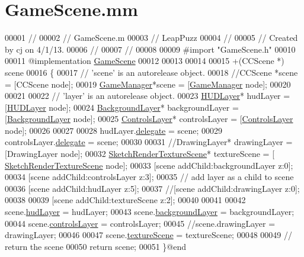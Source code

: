\hypertarget{_game_scene_8mm}{\section{Game\-Scene.\-mm}
\label{d1/d6a/_game_scene_8mm}
}

\begin{DoxyCode}
00001 \textcolor{comment}{//}
00002 \textcolor{comment}{//  GameScene.m}
00003 \textcolor{comment}{//  LeapPuzz}
00004 \textcolor{comment}{//}
00005 \textcolor{comment}{//  Created by cj on 4/1/13.}
00006 \textcolor{comment}{//}
00007 \textcolor{comment}{//}
00008 
00009 \textcolor{preprocessor}{#import "GameScene.h"}
00010 
00011 \textcolor{keyword}{@implementation }\hyperlink{interface_game_scene}{GameScene}
00012 
00013 
00014 
00015 +(CCScene *) scene
00016 \{
00017     \textcolor{comment}{// 'scene' is an autorelease object.}
00018     \textcolor{comment}{//CCScene *scene = [CCScene node];}
00019     \hyperlink{interface_game_manager}{GameManager}*scene = [\hyperlink{interface_game_manager}{GameManager} node];
00020     
00021     
00022     \textcolor{comment}{// 'layer' is an autorelease object.}
00023     \hyperlink{interface_h_u_d_layer}{HUDLayer}* hudLayer = [\hyperlink{interface_h_u_d_layer}{HUDLayer} node];
00024     \hyperlink{interface_background_layer}{BackgroundLayer}* backgroundLayer = [\hyperlink{interface_background_layer}{BackgroundLayer} node];
00025     \hyperlink{interface_controls_layer}{ControlsLayer}* controlsLayer = [\hyperlink{interface_controls_layer}{ControlsLayer} node];
00026     
00027     
00028     hudLayer.\hyperlink{interface_h_u_d_layer_a64cb26c1f8c5a76e8f392a02291c0cf6}{delegate} = scene;
00029     controlsLayer.\hyperlink{interface_controls_layer_aebfe5471226d1bc0afef5d662219f913}{delegate} = scene;
00030     
00031     \textcolor{comment}{//DrawingLayer* drawingLayer = [DrawingLayer node];}
00032     \hyperlink{interface_sketch_render_texture_scene}{SketchRenderTextureScene}* textureScene = [
      \hyperlink{interface_sketch_render_texture_scene}{SketchRenderTextureScene} node];
00033     [scene addChild:backgroundLayer z:0];
00034     [scene addChild:controlsLayer z:3];
00035     \textcolor{comment}{// add layer as a child to scene}
00036     [scene addChild:hudLayer z:5];
00037     \textcolor{comment}{//[scene addChild:drawingLayer z:0];}
00038 
00039     [scene addChild:textureScene z:2];
00040     
00041 
00042     scene.\hyperlink{interface_game_manager_ae286fb2f9d31810d73c7231a574b56b0}{hudLayer} = hudLayer;
00043     scene.\hyperlink{interface_game_manager_a2a3a96f1202b13592f244cf1402b4051}{backgroundLayer} = backgroundLayer;
00044     scene.\hyperlink{interface_game_manager_a0ee5903be06e4a676ddde4c1f03530a7}{controlsLayer} = controlsLayer;
00045     \textcolor{comment}{//scene.drawingLayer = drawingLayer;}
00046 
00047     scene.\hyperlink{interface_game_manager_a79a86ff991f39b3007d99ca61af21253}{textureScene} = textureScene;
00048     
00049     \textcolor{comment}{// return the scene}
00050     \textcolor{keywordflow}{return} scene;
00051 \}\textcolor{keyword}{@end}
\end{DoxyCode}
